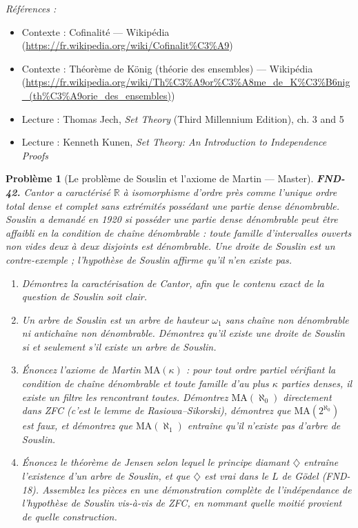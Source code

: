 \documentclass[11pt]{article}
\newtheorem{problem}{Problème}
\newenvironment{refs}{\par\small\noindent\emph{Références :}\begin{itemize}\setlength\itemsep{0pt}}{\end{itemize}\normalsize}
\begin{document}
\begin{refs}
\item Contexte : Cofinalité --- Wikipédia (\url{https://fr.wikipedia.org/wiki/Cofinalit%C3%A9})
\item Contexte : Théorème de König (théorie des ensembles) --- Wikipédia (\url{https://fr.wikipedia.org/wiki/Th%C3%A9or%C3%A8me_de_K%C3%B6nig_(th%C3%A9orie_des_ensembles)})
\item Lecture : Thomas Jech, \textit{Set Theory} (Third Millennium Edition), ch. 3 and 5
\item Lecture : Kenneth Kunen, \textit{Set Theory: An Introduction to Independence Proofs}
\end{refs}

\bigskip

\begin{problem}[{Le problème de Souslin et l'axiome de Martin --- Master}]
\textbf{FND-42.} Cantor a caractérisé $\mathbb{R}$ à isomorphisme d'ordre près comme l'unique ordre total
dense et complet sans extrémités possédant une partie dense dénombrable. Souslin a demandé en 1920
si \og{} posséder une partie dense dénombrable \fg{} peut être affaibli en la \textit{condition de chaîne
dénombrable} : toute famille d'intervalles ouverts non vides deux à deux disjoints est
dénombrable. Une \textit{droite de Souslin} est un contre-exemple ; l'\textit{hypothèse de Souslin}
affirme qu'il n'en existe pas.
\begin{enumerate}
\item[(a)] Démontrez la caractérisation de Cantor, afin que le contenu exact de la question de Souslin
soit clair.
\item[(b)] Un \textit{arbre de Souslin} est un arbre de hauteur $ \omega_1 $ sans chaîne non dénombrable
ni antichaîne non dénombrable. Démontrez qu'il existe une droite de Souslin si et seulement s'il
existe un arbre de Souslin.
\item[(c)] Énoncez l'axiome de Martin $ \mathrm{MA}(\kappa) $ : pour tout ordre partiel vérifiant la
condition de chaîne dénombrable et toute famille d'au plus $ \kappa $ parties denses, il existe
un filtre les rencontrant toutes. Démontrez $ \mathrm{MA}(\aleph_0) $ directement dans ZFC
(c'est le lemme de Rasiowa--Sikorski), démontrez que $ \mathrm{MA}(2^{\aleph_0}) $ est faux, et
démontrez que $ \mathrm{MA}(\aleph_1) $ entraîne qu'il n'existe pas d'arbre de Souslin.
\item[(d)] Énoncez le théorème de Jensen selon lequel le principe diamant $ \diamondsuit $ entraîne
l'existence d'un arbre de Souslin, et que $ \diamondsuit $ est vrai dans le $ L $ de Gödel
(FND-18). Assemblez les pièces en une démonstration complète de l'indépendance de l'hypothèse de
Souslin vis-à-vis de ZFC, en nommant quelle moitié provient de quelle construction.
\end{enumerate}

\end{problem}
\end{document}
